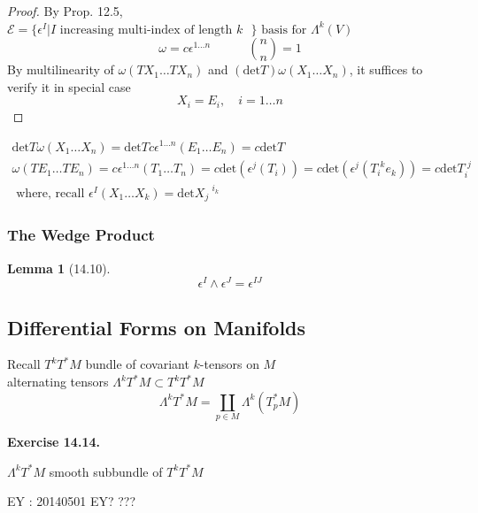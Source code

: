 \documentclass[11pt]{amsart}
\newtheorem{lemma}{Lemma}
\theoremstyle{definition}
\newcommand{\exercisehead}[1]{\medskip\noindent\textbf{Exercise #1.} }
\begin{document}
\begin{proof}
  By Prop. 12.5, $\mathcal{E} = \lbrace \epsilon^I | I \text{ increasing multi-index of length $k$ } \rbrace \text{ basis for $\Lambda^k(V)$ }$
\[
\omega = c\epsilon^{1 \dots n} \quad \quad \quad \binom{n}{n} =1
\]
By multilinearity of $\omega(TX_1 \dots TX_n)$ and $(\text{det}{T}) \omega(X_1 \dots X_n)$, it suffices to verify it in special case
\[
X_i = E_i, \quad i = 1 \dots n
\]
\end{proof}

\[
\begin{gathered}
  \text{det}{T} \omega(X_1 \dots X_n) = \text{det}{T} c\epsilon^{1\dots n}(E_1 \dots E_n) = c\text{det}{T} \\
  \omega(TE_1 \dots TE_n) = c\epsilon^{1\dots n}(T_1 \dots T_n) = c\text{det}{( \epsilon^j(T_i)) } = c\text{det}{ (\epsilon^j(T_i^{ \, \, k}e_k) ) } = c\text{det}{T_i^{\, \, j}} \\
\text{ where, recall } \epsilon^I(X_1 \dots X_k) = \text{det}{X_j}^{ \, \, i_k}
\end{gathered}
\]




\subsubsection*{ The Wedge Product }

\begin{lemma}[14.10]
  \begin{equation}
    \epsilon^I \wedge \epsilon^J = \epsilon^{IJ}
\end{equation}
\end{lemma}

\subsection*{ Differential Forms on Manifolds }

Recall $T^k T^*M$ bundle of covariant $k$-tensors on $M$ \\
\quad alternating tensors $\Lambda^k T^*M \subset T^k T^*M$ \\

\[
\Lambda^k T^*M = \coprod_{ p \in M} \Lambda^k{ ( T^*_p M )}
\]

\exercisehead{14.14}

$\Lambda^k T^*M$ smooth subbundle of $T^kT^*M$

EY : 20140501 EY? ???

\hrulefill
\end{document}
